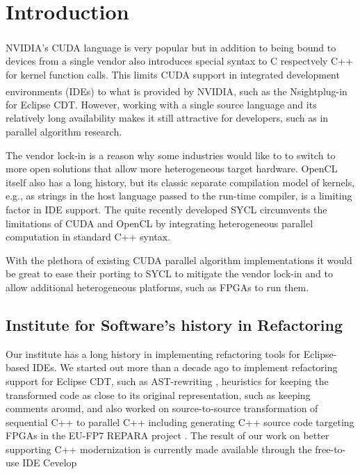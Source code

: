 \documentclass[sigconf]{acmart}
\newcommand{\nvidia}{NVIDIA\textsuperscript{\textregistered}}
\newcommand{\nsight}{Nsight\texttrademark{}}
\begin{document}
%
\maketitle

\section{Introduction}

\nvidia's CUDA language is very popular but in addition to being bound to devices from a single vendor also introduces special syntax to C respectvely C++ for kernel function calls. This limits CUDA support in integrated development environments (IDEs) to what is provided by \nvidia, such as the \nsight plug-in for Eclipse CDT. However, working with a single source language and its relatively long availability makes it still attractive for developers, such as in parallel algorithm research.

The vendor lock-in is a reason why some industries would like to to switch to more open solutions that allow more heterogeneous target hardware. OpenCL itself also has a long history, but its classic separate compilation model of kernels, e.g., as strings in the host language passed to the run-time compiler, is a limiting factor in IDE support. The quite recently developed SYCL circumvents the limitations of CUDA and OpenCL by integrating heterogeneous parallel computation in standard C++ syntax.

With the plethora of existing CUDA parallel algorithm implementations it would be great to ease their porting to SYCL to mitigate the vendor lock-in and to allow additional heterogeneous platforms, such as FPGAs to run them.

\subsection{Institute for Software's history in Refactoring}
Our institute has a long history in implementing refactoring tools for Eclipse-based IDEs. We started out more than a decade ago to implement refactoring support for Eclipse CDT, such as AST-rewriting \cite{Graf2007}, heuristics for keeping the transformed code as close to its original representation, such as keeping comments around\cite{Sommerlad2008}, and also worked on source-to-source transformation of sequential C++ to parallel C++ including generating C++ source code targeting FPGAs in the EU-FP7 REPARA project
\cite{repara2016} \cite{repara2016a}. The result of our work on better supporting C++ modernization is currently made available through the free-to-use IDE Cevelop\cite{cevelop}
\end{document}
